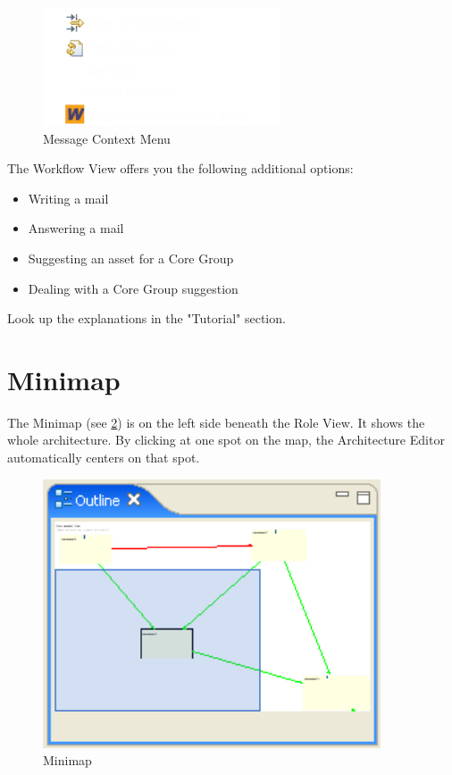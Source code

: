\begin{figure}[h!]
\begin{center}
\includegraphics[width=7cm]{workflowkontext.png}
   \caption{Message Context Menu}
\label{workflowkontext}
\end{center}
\end{figure}\par

The Workflow View offers you the following additional options:
\begin{itemize}
	\item Writing a mail
	\item Answering a mail
	\item Suggesting an asset for a Core Group
	\item Dealing with a Core Group suggestion
\end{itemize}
Look up the explanations in the "Tutorial" section.

\section{Minimap}

The Minimap (see \ref{map}) is on the left side beneath the Role View. It shows the whole architecture.
By clicking at one spot on the map, the Architecture Editor automatically centers on that
spot. 

\begin{figure}[h!]
\begin{center}
\includegraphics[width=10cm]{outline.png}
   \caption{Minimap}
\label{map}
\end{center}
\end{figure}\par


